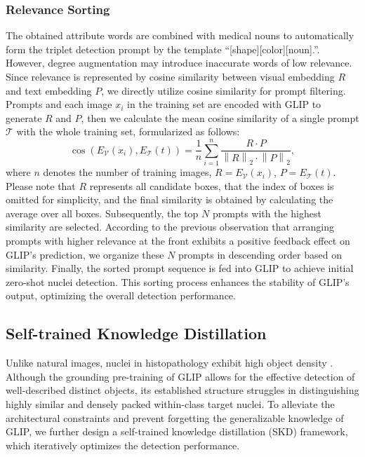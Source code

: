 \documentclass[journal,twoside,web]{ieeecolor}
\begin{document}
\subsubsection{Relevance Sorting}
\label{sec:RS}
The obtained attribute words are combined with medical nouns to automatically form the triplet detection prompt by the template “[shape][color][noun].”. However, degree augmentation may introduce inaccurate words of low relevance. Since relevance is represented by cosine similarity between visual embedding $R$ and text embedding $P$, we directly utilize cosine similarity for prompt filtering. Prompts and each image $x_{i}$ in the training set are encoded with GLIP to generate $R$ and $P$, then we calculate the mean cosine similarity of a single prompt ${\mathcal{T}}$ with the whole training set, formularized as follows:
\begin{equation}
\label{eq4}
\cos \left(E_{\mathcal{V}}\left(x_i\right), E_{\mathcal{T}}(t)\right)=\frac{1}{n} \sum_{i=1}^n \frac{R \cdot P}{\left\|R\right\|_2 \cdot\left\|P\right\|_2},
\end{equation}
where $n$ denotes the number of training images, $R = E_{\mathcal{V}}\left(x_i\right)$, $P = E_{\mathcal{T}}(t)$. Please note that $R$ represents all candidate boxes, that the index of boxes is omitted for simplicity, and the final similarity is obtained by calculating the average over all boxes. Subsequently, the top $N$ prompts with the highest similarity are selected. According to the previous observation that arranging prompts with higher relevance at the front exhibits a positive feedback effect on GLIP's prediction, we organize these $N$ prompts in descending order based on similarity. Finally, the sorted prompt sequence is fed into GLIP to achieve initial zero-shot nuclei detection. This sorting process enhances the stability of GLIP's output, optimizing the overall detection performance.

\subsection{Self-trained Knowledge Distillation}
Unlike natural images, nuclei in histopathology exhibit high object density \cite{zhou2023cyclic}. Although the grounding pre-training of GLIP allows for the effective detection of well-described distinct objects, its established structure struggles in distinguishing highly similar and densely packed within-class target nuclei. To alleviate the architectural constraints and prevent forgetting the generalizable knowledge of GLIP, we further design a self-trained knowledge distillation (SKD) framework, which iteratively optimizes the detection performance.
\end{document}
